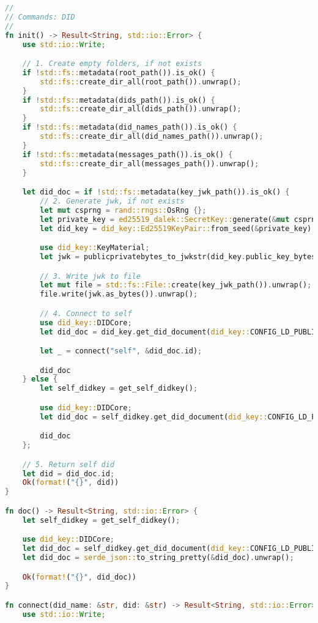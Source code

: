 \begin{lstlisting}[language=Rust]
//
// Commands: DID
//
fn init() -> Result<String, std::io::Error> {
    use std::io::Write;

    // 1. Create empty folders, if not exists
    if !std::fs::metadata(root_path()).is_ok() {
        std::fs::create_dir_all(root_path()).unwrap();
    }
    if !std::fs::metadata(dids_path()).is_ok() {
        std::fs::create_dir_all(dids_path()).unwrap();
    }
    if !std::fs::metadata(did_names_path()).is_ok() {
        std::fs::create_dir_all(did_names_path()).unwrap();
    }
    if !std::fs::metadata(messages_path()).is_ok() {
        std::fs::create_dir_all(messages_path()).unwrap();
    }

    let did_doc = if !std::fs::metadata(key_jwk_path()).is_ok() {
        // 2. Generate jwk, if not exists
        let mut csprng = rand::rngs::OsRng {};
        let private_key = ed25519_dalek::SecretKey::generate(&mut csprng).to_bytes();
        let did_key = did_key::Ed25519KeyPair::from_seed(&private_key);

        use did_key::KeyMaterial;
        let jwk = publicprivatebytes_to_jwkstr(did_key.public_key_bytes(), did_key.private_key_bytes());

        // 3. Write jwk to file
        let mut file = std::fs::File::create(key_jwk_path()).unwrap();
        file.write(jwk.as_bytes()).unwrap();

        // 4. Connect to self
        use did_key::DIDCore;
        let did_doc = did_key.get_did_document(did_key::CONFIG_LD_PUBLIC);

        let _ = connect("self", &did_doc.id);

        did_doc
    } else {
        let self_didkey = get_self_didkey();

        use did_key::DIDCore;
        let did_doc = self_didkey.get_did_document(did_key::CONFIG_LD_PUBLIC);

        did_doc
    };

    // 5. Return self did
    let did = did_doc.id;
    Ok(format!("{}", did))
}

fn doc() -> Result<String, std::io::Error> {
    let self_didkey = get_self_didkey();

    use did_key::DIDCore;
    let did_doc = self_didkey.get_did_document(did_key::CONFIG_LD_PUBLIC);
    let did_doc = serde_json::to_string_pretty(&did_doc).unwrap();

    Ok(format!("{}", did_doc))
}

fn connect(did_name: &str, did: &str) -> Result<String, std::io::Error> {
    use std::io::Write;


\end{lstlisting}
